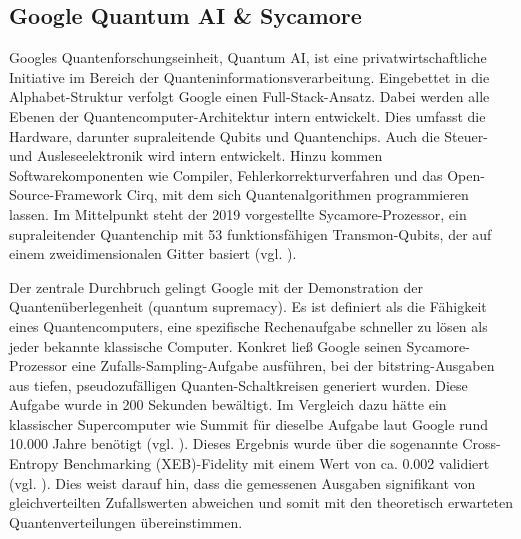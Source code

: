 \subsection*{Google Quantum AI \& Sycamore} 
\label{Chemie_Projekte_Google_Quantum_AI}

Googles Quantenforschungseinheit, Quantum AI, ist eine privatwirtschaftliche Initiative im Bereich der Quanteninformationsverarbeitung.  Eingebettet in die Alphabet-Struktur verfolgt Google einen Full-Stack-Ansatz. Dabei werden alle Ebenen der Quantencomputer-Architektur intern entwickelt. Dies umfasst die Hardware, darunter supraleitende Qubits und Quantenchips. Auch die Steuer- und Ausleseelektronik wird intern entwickelt. Hinzu kommen Softwarekomponenten wie Compiler, Fehlerkorrekturverfahren und das Open-Source-Framework Cirq, mit dem sich Quantenalgorithmen programmieren lassen. Im Mittelpunkt steht der 2019 vorgestellte Sycamore-Prozessor, ein supraleitender Quantenchip mit 53 funktionsfähigen Transmon-Qubits, der auf einem zweidimensionalen Gitter basiert (vgl. \cite{aruteQuantumSupremacyUsing2019a}).

\vspace{0.5em}

Der zentrale Durchbruch gelingt Google mit der Demonstration der Quantenüberlegenheit (quantum supremacy). Es ist definiert als die Fähigkeit eines Quantencomputers, eine spezifische Rechenaufgabe schneller zu lösen als jeder bekannte klassische Computer. Konkret ließ Google seinen Sycamore-Prozessor eine Zufalls-Sampling-Aufgabe ausführen, bei der bitstring-Ausgaben aus tiefen, pseudozufälligen Quanten-Schaltkreisen generiert wurden. Diese Aufgabe wurde in 200 Sekunden bewältigt. Im Vergleich dazu hätte ein klassischer Supercomputer wie Summit für dieselbe Aufgabe laut Google rund 10.000 Jahre benötigt (vgl. \cite{aruteQuantumSupremacyUsing2019a}).
Dieses Ergebnis wurde über die sogenannte Cross-Entropy Benchmarking (XEB)-Fidelity mit einem Wert von ca. 0.002 validiert (vgl. \cite{maksudul_shadat_akash_quantum_2025}). Dies weist darauf hin, dass die gemessenen Ausgaben signifikant von gleichverteilten Zufallswerten abweichen und somit mit den theoretisch erwarteten Quantenverteilungen übereinstimmen.

\vspace{0.5em}

